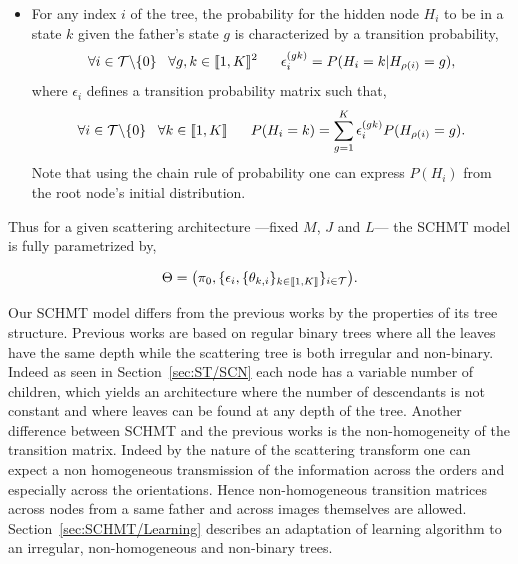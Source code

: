 \documentclass[a4paper,11pt]{report}
\begin{document}
\begin{itemize}
			\item For any index $i$ of the tree, the probability for the hidden node $H_{i}$ to be in a state $k$ given the father's state $g$ is characterized by a transition probability,
				\begin{equation}
					\forall i \in \mathcal{T} \backslash \{ 0 \} \;\;\; \forall g,k \in \llbracket1,K\rrbracket^{2}
					\;\;\;\;\;\; \epsilon_{i}^{(gk)} = P(H_{i}= k | H_{\rho(i)}=g), 
					\label{eq:SCHMT - Transition matrix}
				\end{equation}
				where $\epsilon_{i}$ defines a transition probability matrix such that,
				\begin{equation}
				  \forall i \in \mcalT \backslash\{0\} \;\;\;  \forall k \in \llbracket1,K\rrbracket
					\;\;\;\;\;\;  P(H_{i}=k) = \sum_{g=1}^{K} \epsilon_{i}^{(gk)} P(H_{\rho(i)}=g). %
				  \label{eq:SCHMT - State proba 1}
				\end{equation}
				Note that using the chain rule of probability one can express $P(H_{i})$ from the root node's initial distribution.\\
		\end{itemize}
		
		Thus for a given scattering architecture ---\ie fixed $M$, $J$ and $L$--- the SCHMT model is fully parametrized by,
		
		\begin{equation}
			\Theta = \big(\pi_{0}, \{ \epsilon_{i}, \{ \theta_{k,i} \}_{k\in\llbracket1,K\rrbracket} \}_{i\in\mathcal{T}}\big).
			\label{eq:SCHMT - parameters}
		\end{equation}
		
    Our SCHMT model differs from the previous works by the properties of its tree structure. Previous works are based on regular binary trees where all the leaves have the same depth while the scattering tree is both irregular and non-binary. Indeed as seen in Section~\ref{sec:ST/SCN} each node has a variable number of children, which yields an architecture where the number of descendants is not constant and where leaves can be found at any depth of the tree. Another difference between SCHMT and the previous works is the non-homogeneity of the transition matrix. Indeed by the nature of the scattering transform one can expect a non homogeneous transmission of the information across the orders and especially across the orientations. Hence non-homogeneous transition matrices across nodes from a same father and across images themselves are allowed. Section~\ref{sec:SCHMT/Learning} describes an adaptation of \citet{durand2004computational} learning algorithm to an irregular, non-homogeneous and non-binary trees.\\
    
\end{document}
